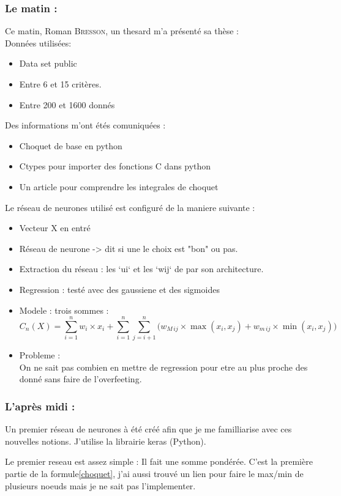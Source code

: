 ﻿\subsubsection*{Le matin :}
Ce matin, Roman \textsc{Bresson}, un thesard m'a présenté sa thèse : \\


Données utilisées:
\begin{itemize}
    \item Data set public
    \item Entre 6 et 15 critères.
    \item Entre 200 et 1600 donnés
\end{itemize}


Des informations m'ont étés comuniquées :
\begin{itemize}
    \item Choquet de base en python
    \item Ctypes pour importer des fonctions C dans python
    \item Un article pour comprendre les integrales de choquet\cite{grabisch2016fuzzy}
\end{itemize}


Le réseau de neurones utilisé est configuré de la maniere suivante :
\begin{itemize}
     \item Vecteur X en entré
     \item Réseau de neurone -> dit si une le choix est "bon" ou pas.
     \item Extraction du réseau : les `ui` et les `wij` de par son architecture.
     \item Regression : testé avec des gaussiene et des sigmoides
     \item Modele : trois sommes :
        \begin{equation}
            \label{choquet}
            C_n (X)  =
            \sum_{i=1}^{n}
                w_i \times x_i +
            \sum_{i=1}^{n}\sum_{j=i+1}^{n}
            \Big(
                w_{M\,ij} \times \max(x_i,x_j) + w_{m\,ij} \times \min(x_i,x_j)
            \Big)
        \end{equation}
    \item Probleme : \\
        On ne sait pas combien en mettre de regression pour etre au plus proche des donné sans faire de l'overfeeting.
\end{itemize}

\subsubsection*{L'après midi :}
Un premier réseau de neurones à été créé afin que je me familliarise avec ces nouvelles notions.
J'utilise la librairie keras\cite{keras} (Python).


Le premier reseau est assez simple : Il fait une somme pondérée.
C'est la première partie de la formule\ref{choquet}, j'ai aussi trouvé un lien pour faire le max/min de plusieurs
noeuds mais je ne sait pas l'implementer.
